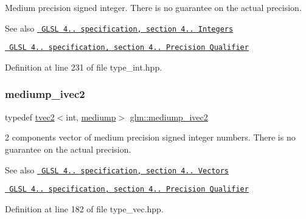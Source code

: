 Medium precision signed integer. There is no guarantee on the actual precision.

\begin{DoxySeeAlso}{See also}
\href{http://www.opengl.org/registry/doc/GLSLangSpec.4.20.8.pdf}{\texttt{ G\+L\+SL 4.. specification, section 4.. Integers}} 

\href{http://www.opengl.org/registry/doc/GLSLangSpec.4.20.8.pdf}{\texttt{ G\+L\+SL 4.. specification, section 4.. Precision Qualifier}} 
\end{DoxySeeAlso}


Definition at line 231 of file type\+\_\+int.\+hpp.

\mbox{\label{group__core__precision_ga38b24c06ac0dfe4dcfbe7abf9a93dbb4}} 
\subsubsection{\texorpdfstring{mediump\_ivec2}{mediump\_ivec2}}
{\footnotesize\ttfamily typedef \mbox{\hyperlink{structglm_1_1tvec2}{tvec2}}$<$int, \mbox{\hyperlink{namespaceglm_a0f04f086094c747d227af4425893f545a6416f3ea0c9025fb21ed50c4d6620482}{mediump}}$>$ \mbox{\hyperlink{group__core__precision_ga38b24c06ac0dfe4dcfbe7abf9a93dbb4}{glm\+::mediump\+\_\+ivec2}}}

2 components vector of medium precision signed integer numbers. There is no guarantee on the actual precision.

\begin{DoxySeeAlso}{See also}
\href{http://www.opengl.org/registry/doc/GLSLangSpec.4.20.8.pdf}{\texttt{ G\+L\+SL 4.. specification, section 4.. Vectors}} 

\href{http://www.opengl.org/registry/doc/GLSLangSpec.4.20.8.pdf}{\texttt{ G\+L\+SL 4.. specification, section 4.. Precision Qualifier}} 
\end{DoxySeeAlso}


Definition at line 182 of file type\+\_\+vec.\+hpp.

\mbox{\label{group__core__precision_ga16a38c6077c2e83375ee258cd95e224b}} 
